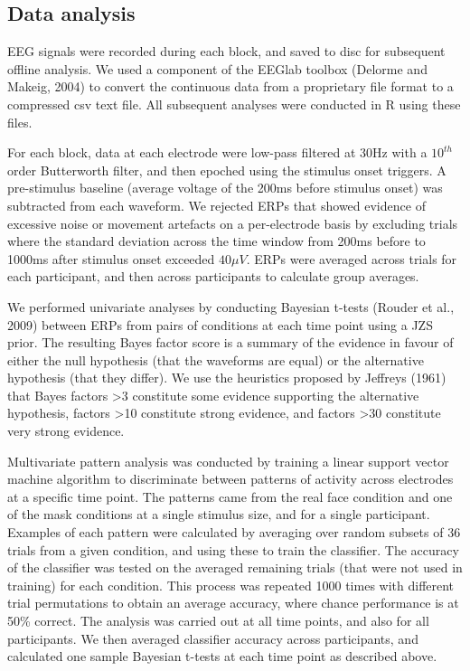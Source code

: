 \documentclass[
]{article}
\begin{document}
\hypertarget{data-analysis}{%
\subsection{Data analysis}\label{data-analysis}}

EEG signals were recorded during each block, and saved to disc for subsequent offline analysis. We used a component of the EEGlab toolbox (Delorme and Makeig, 2004) to convert the continuous data from a proprietary file format to a compressed csv text file. All subsequent analyses were conducted in R using these files.

For each block, data at each electrode were low-pass filtered at 30Hz with a \(10^{th}\) order Butterworth filter, and then epoched using the stimulus onset triggers. A pre-stimulus baseline (average voltage of the 200ms before stimulus onset) was subtracted from each waveform. We rejected ERPs that showed evidence of excessive noise or movement artefacts on a per-electrode basis by excluding trials where the standard deviation across the time window from 200ms before to 1000ms after stimulus onset exceeded \(40\mu V\). ERPs were averaged across trials for each participant, and then across participants to calculate group averages.

We performed univariate analyses by conducting Bayesian t-tests (Rouder et al., 2009) between ERPs from pairs of conditions at each time point using a JZS prior. The resulting Bayes factor score is a summary of the evidence in favour of either the null hypothesis (that the waveforms are equal) or the alternative hypothesis (that they differ). We use the heuristics proposed by Jeffreys (1961) that Bayes factors \textgreater3 constitute some evidence supporting the alternative hypothesis, factors \textgreater10 constitute strong evidence, and factors \textgreater30 constitute very strong evidence.

Multivariate pattern analysis was conducted by training a linear support vector machine algorithm to discriminate between patterns of activity across electrodes at a specific time point. The patterns came from the real face condition and one of the mask conditions at a single stimulus size, and for a single participant. Examples of each pattern were calculated by averaging over random subsets of 36 trials from a given condition, and using these to train the classifier. The accuracy of the classifier was tested on the averaged remaining trials (that were not used in training) for each condition. This process was repeated 1000 times with different trial permutations to obtain an average accuracy, where chance performance is at 50\% correct. The analysis was carried out at all time points, and also for all participants. We then averaged classifier accuracy across participants, and calculated one sample Bayesian t-tests at each time point as described above.
\end{document}
